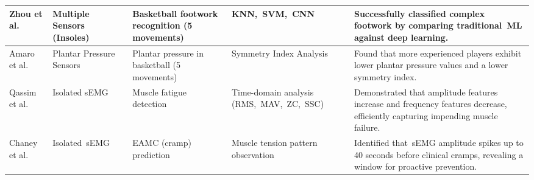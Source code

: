 \begin{table}[ht]
\begin{tabularx}{\textwidth}{|p{2cm}|p{2cm}|p{2cm}|p{2cm}|X|}
Zhou et al.~\cite{basketballFootwork} &
Multiple Sensors (Insoles) &
Basketball footwork recognition (5 movements) &
\gls{KNN},~\gls{SVM},~\gls{CNN} &
Successfully classified complex footwork by comparing traditional~\gls{ML} against deep learning. \\
\hline

Amaro et al.~\cite{coimbra} &
Plantar Pressure Sensors &
Plantar pressure in basketball (5 movements) &
Symmetry Index Analysis &
Found that more experienced players exhibit lower plantar pressure values and a lower symmetry index. \\
\hline

Qassim et al.~\cite{ProposedFatigueIndex} &
Isolated sEMG &
Muscle fatigue detection &
Time-domain analysis (\gls{RMS},~\gls{MAV},~\gls{ZC},~\gls{SSC}) &
Demonstrated that amplitude features increase and frequency features decrease, efficiently capturing impending muscle failure. \\
\hline

Chaney et al.~\cite{ChangesInMuscleTension} &
Isolated~\gls{sEMG} &
\gls{EAMC} (cramp) prediction &
Muscle tension pattern observation &
Identified that~\gls{sEMG} amplitude spikes up to 40 seconds before clinical cramps, revealing a window for proactive prevention. \\
\hline

\end{tabularx}
\end{table}





